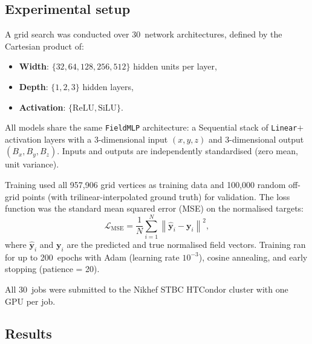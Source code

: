 \documentclass[11pt,a4paper]{article}
\begin{document}
\subsection{Experimental setup}

A grid search was conducted over 30~network architectures, defined by
the Cartesian product of:
\begin{itemize}
    \item \textbf{Width}: $\{32, 64, 128, 256, 512\}$ hidden units per layer,
    \item \textbf{Depth}: $\{1, 2, 3\}$ hidden layers,
    \item \textbf{Activation}: $\{\text{ReLU}, \text{SiLU}\}$.
\end{itemize}
All models share the same \texttt{FieldMLP} architecture: a Sequential
stack of \texttt{Linear}$+$activation layers with a 3-dimensional input
$(x,y,z)$ and 3-dimensional output $(B_x, B_y, B_z)$.  Inputs and
outputs are independently standardised (zero mean, unit variance).

Training used all 957{,}906 grid vertices as training data and
100{,}000 random off-grid points (with trilinear-interpolated ground
truth) for validation.  The loss function was the standard mean squared
error (MSE) on the normalised targets:
\begin{equation}
    \mathcal{L}_{\text{MSE}} = \frac{1}{N}\sum_{i=1}^{N}
        \left\lVert \hat{\mathbf{y}}_i - \mathbf{y}_i \right\rVert^2,
    \label{eq:mse}
\end{equation}
where $\hat{\mathbf{y}}_i$ and $\mathbf{y}_i$ are the predicted and
true normalised field vectors.  Training ran for up to 200~epochs with
Adam (learning rate $10^{-3}$), cosine annealing, and early stopping
(patience = 20).

All 30~jobs were submitted to the Nikhef STBC HTCondor cluster with
one GPU per job.

\subsection{Results}
\end{document}
